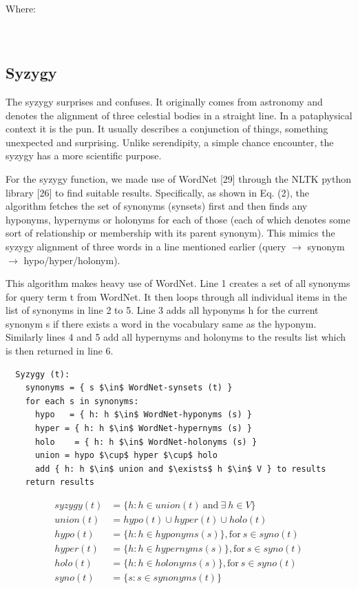 Where:\\
 \\
 \\




\subsection{Syzygy}

The syzygy surprises and confuses. It originally comes from astronomy and denotes the alignment of three celestial bodies in a straight line. In a pataphysical context it is the pun. It usually describes a conjunction of things, something unexpected and surprising. Unlike serendipity, a simple chance encounter, the syzygy has a more scientific purpose.

For the syzygy function, we made use of WordNet [29] through the NLTK python library [26] to find suitable results. Specifically, as shown in Eq. (2), the algorithm fetches the set of synonyms (synsets) first and then finds any hyponyms, hypernyms or holonyms for each of those (each of which denotes some sort of relationship or membership with its parent synonym). This mimics the syzygy alignment of three words in a line mentioned earlier (query $\to$ synonym $\to$ hypo/hyper/holonym).

This algorithm makes heavy use of WordNet. Line 1 creates a set of all synonyms for query term t from WordNet. It then loops through all individual items in the list of synonyms in line 2 to 5. Line 3 adds all hyponyms h for the current synonym s if there exists a word in the vocabulary same as the hyponym. Similarly lines 4 and 5 add all hypernyms and holonyms to the results list which is then returned in line 6.

\begin{verbatim}
  Syzygy (t):
    synonyms = { s $\in$ WordNet-synsets (t) }
    for each s in synonyms:
      hypo   = { h: h $\in$ WordNet-hyponyms (s) }
      hyper = { h: h $\in$ WordNet-hypernyms (s) }
      holo    = { h: h $\in$ WordNet-holonyms (s) }
      union = hypo $\cup$ hyper $\cup$ holo
      add { h: h $\in$ union and $\exists$ h $\in$ V } to results
    return results
\end{verbatim}

\begin{equation}
\begin{split}
  syzygy(t) &= \{ h \colon h \in union(t) \ \text{and} \ \exists \ h \in V \}\\%
  union(t) &= hypo(t) \cup hyper(t) \cup holo(t)\\
  hypo(t) &= \{ h \colon h \in hyponyms(s) \}, \text{for} \ s \in syno(t)\\
  hyper(t) &= \{ h \colon h \in hypernyms(s) \}, \text{for} \ s \in syno(t)\\
  holo(t) &= \{ h \colon h \in holonyms(s) \}, \text{for} \ s \in syno(t)\\
  syno(t) &= \{ s \colon s \in synonyms(t) \}
\end{split}
\label{eq:syzygy}
\end{equation}


